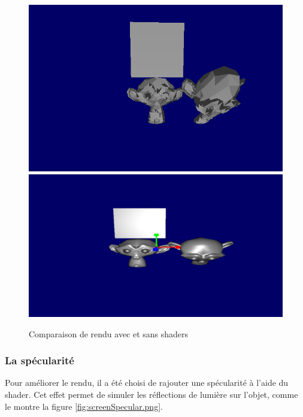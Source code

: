 \begin{figure}[h!]
	\centering
	\includegraphics[scale=0.47]{images/rendu_sans_shader.png}
        \includegraphics[scale=0.3]{images/singe_shaders.png}
	\caption{\label{fig:screenRenduSansShader.png} Comparaison de rendu avec et sans shaders \protect}
\end{figure}

\subsubsection{La spécularité}
Pour améliorer le rendu, il a été choisi de rajouter une spécularité à l'aide du shader. Cet effet permet de simuler les réflections de lumière sur l'objet, comme le montre la figure \ref{fig:screenSpecular.png}.


